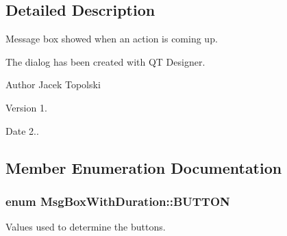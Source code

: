 \subsection{Detailed Description}
Message box showed when an action is coming up. 

The dialog has been created with Q\-T Designer. \begin{DoxyAuthor}{Author}
Jacek Topolski 
\end{DoxyAuthor}
\begin{DoxyVersion}{Version}
1. 
\end{DoxyVersion}
\begin{DoxyDate}{Date}
2.. 
\end{DoxyDate}


\subsection{Member Enumeration Documentation}
\hypertarget{class_msg_box_with_duration_a073eed452996a098c2cc5c6e8c4b2d41}{
\subsubsection[{B\-U\-T\-T\-O\-N}]{\setlength{\rightskip}{0pt plus 5cm}enum {\bf Msg\-Box\-With\-Duration\-::\-B\-U\-T\-T\-O\-N}}}\label{class_msg_box_with_duration_a073eed452996a098c2cc5c6e8c4b2d41}


Values used to determine the buttons. 


